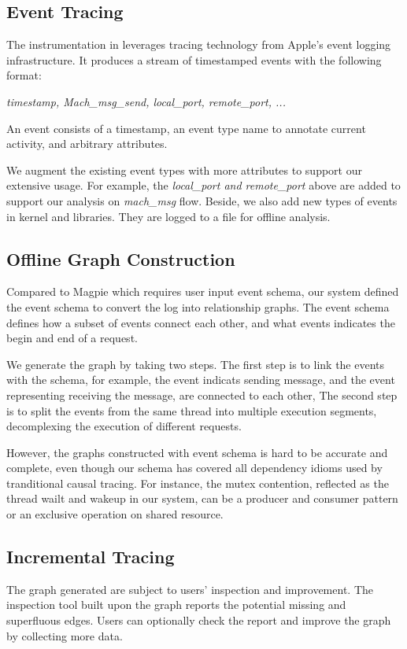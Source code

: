 \subsection{Event Tracing}
The instrumentation in \xxx leverages tracing technology from Apple's event logging infrastructure.
It produces a stream of timestamped events with the following format:

\textit{timestamp, Mach\_msg\_send, local\_port, remote\_port, ...}

An event consists of a timestamp, an event type name to annotate current activity, and arbitrary attributes.

We augment the existing event types with more attributes to support our extensive usage.
For example, the \textit{local\_port and remote\_port} above are added to support our analysis on \textit{ mach\_msg} flow.
Beside, we also add new types of events in kernel and libraries. 
They are logged to a file for offline analysis.

\subsection{Offline Graph Construction}
Compared to Magpie which requires user input event schema, our system defined the event schema to convert the log into relationship graphs.
The event schema defines how a subset of events connect each other, and what events indicates the begin and end of a request.

We generate the graph by taking two steps.
The first step is to link the events with the schema, for example, the event indicats sending message, and the event representing receiving the message, are connected to each other,
The second step is to split the events from the same thread into multiple execution segments, decomplexing the execution of different requests.

However, the graphs constructed with event schema is hard to be accurate and complete, even though our schema has covered all dependency idioms used by tranditional causal tracing.
For instance, the mutex contention, reflected as the thread wailt and wakeup in our system, can be a producer and consumer pattern or an exclusive operation on shared resource. 

\subsection{Incremental Tracing}
The graph generated are subject to users' inspection and improvement.
The inspection tool built upon the graph reports the potential missing and superfluous edges.
Users can optionally check the report and improve the graph by collecting more data.

